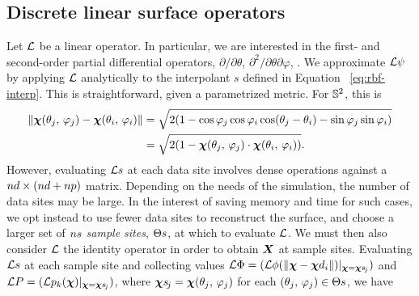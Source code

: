 \subsection{Discrete linear surface operators}

Let $\mathcal{L}$ be a linear operator. In particular, we are interested in the first- and
second-order partial differential operators, $\partial/\partial\theta$,
$\partial^2/\partial\theta\partial\varphi$, . We approximate $\mathcal{L}\psi$ by
applying $\mathcal{L}$ analytically to the interpolant $s$ defined in Equation~%
\eqref{eq:rbf-interp}. This is straightforward, given a parametrized metric. For
$\mathbb{S}^2$, this is
\begin{equation}\label{eq:sphere-metric}
    \begin{aligned}
    \|\boldsymbol{\chi}(\theta_j,\,\varphi_j) - \boldsymbol{\chi}(\theta_i,\,\varphi_i)\|
    &= \sqrt{2(1 - \cos\varphi_j\cos\varphi_i\cos(\theta_j-\theta_i) - \sin\varphi_j\sin\varphi_i)} \\
    &= \sqrt{2(1-\boldsymbol{\chi}(\theta_j,\,\varphi_j)\cdot\boldsymbol{\chi}(\theta_i,\,\varphi_i))}.
\end{aligned}
\end{equation}
However, evaluating $\mathcal{L} s$ at each data site involves dense operations against a
$\data\cardinality\times(\data\cardinality+\poly\cardinality)$ matrix. Depending on the
needs of the simulation, the number of data sites may be large.  In the interest of
saving memory and time for such cases, we opt instead to use fewer data sites to
reconstruct the surface, and choose a larger set of $\sample\cardinality$ \emph{sample
sites}, $\sample\sites$, at which to evaluate $\mathcal{L}$. We must then also consider $\mathcal{L}$ the
identity operator in order to obtain $\boldsymbol{X}$ at sample sites. Evaluating $\mathcal{L} s$ at each
sample site and collecting values $\L\Phi = (\L\phi(\|\Xp-\data\Xp_i\|)|_{\Xp=\Xpsj})$
and $\L P = (\L p_k(\Xp)|_{\Xp=\Xpsj})$, where $\Xpsj = \Xp(\theta_j,\,\varphi_j)$ for
each $(\theta_j,\,\varphi_j)\in\sample\sites$, we have
